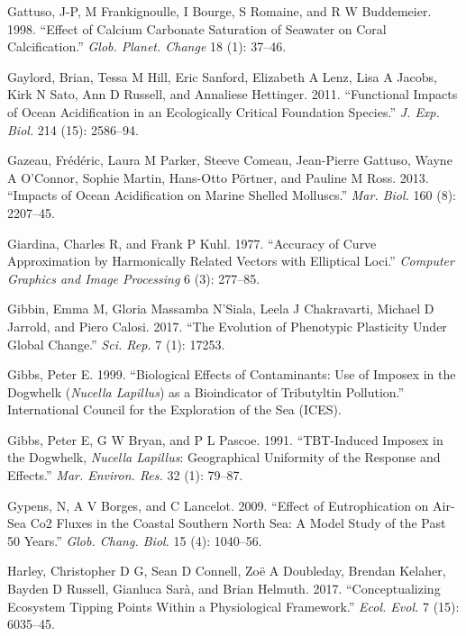 \documentclass[smallextended]{svjour3}       %
\newlength{\cslhangindent}
\newenvironment{CSLReferences}[2] %
 {%
  \setlength{\parindent}{0pt}
  \ifodd #1 \everypar{\setlength{\hangindent}{\cslhangindent}}\ignorespaces\fi
  \ifnum #2 > 0
  \setlength{\parskip}{#2\baselineskip}
  \fi
 }%
 {}
\begin{document}
\begin{CSLReferences}{1}{0}
\leavevmode{}%
Gattuso, J-P, M Frankignoulle, I Bourge, S Romaine, and R W Buddemeier.
1998. {``Effect of Calcium Carbonate Saturation of Seawater on Coral
Calcification.''} \emph{Glob. Planet. Change} 18 (1): 37--46.

\leavevmode{}%
Gaylord, Brian, Tessa M Hill, Eric Sanford, Elizabeth A Lenz, Lisa A
Jacobs, Kirk N Sato, Ann D Russell, and Annaliese Hettinger. 2011.
{``Functional Impacts of Ocean Acidification in an Ecologically Critical
Foundation Species.''} \emph{J. Exp. Biol.} 214 (15): 2586--94.

\leavevmode{}%
Gazeau, Frédéric, Laura M Parker, Steeve Comeau, Jean-Pierre Gattuso,
Wayne A O'Connor, Sophie Martin, Hans-Otto Pörtner, and Pauline M Ross.
2013. {``Impacts of Ocean Acidification on Marine Shelled Molluscs.''}
\emph{Mar. Biol.} 160 (8): 2207--45.

\leavevmode{}%
Giardina, Charles R, and Frank P Kuhl. 1977. {``Accuracy of Curve
Approximation by Harmonically Related Vectors with Elliptical Loci.''}
\emph{Computer Graphics and Image Processing} 6 (3): 277--85.

\leavevmode{}%
Gibbin, Emma M, Gloria Massamba N'Siala, Leela J Chakravarti, Michael D
Jarrold, and Piero Calosi. 2017. {``The Evolution of Phenotypic
Plasticity Under Global Change.''} \emph{Sci. Rep.} 7 (1): 17253.

\leavevmode{}%
Gibbs, Peter E. 1999. {``Biological Effects of Contaminants: Use of
Imposex in the Dogwhelk (\emph{Nucella Lapillus}) as a Bioindicator of
Tributyltin Pollution.''} International Council for the Exploration of
the Sea (ICES).

\leavevmode{}%
Gibbs, Peter E, G W Bryan, and P L Pascoe. 1991. {``TBT-Induced Imposex
in the Dogwhelk, \emph{Nucella Lapillus}: Geographical Uniformity of the
Response and Effects.''} \emph{Mar. Environ. Res.} 32 (1): 79--87.

\leavevmode{}%
Gypens, N, A V Borges, and C Lancelot. 2009. {``Effect of Eutrophication
on Air-Sea Co2 Fluxes in the Coastal Southern North Sea: A Model Study
of the Past 50 Years.''} \emph{Glob. Chang. Biol.} 15 (4): 1040--56.

\leavevmode{}%
Harley, Christopher D G, Sean D Connell, Zoë A Doubleday, Brendan
Kelaher, Bayden D Russell, Gianluca Sarà, and Brian Helmuth. 2017.
{``Conceptualizing Ecosystem Tipping Points Within a Physiological
Framework.''} \emph{Ecol. Evol.} 7 (15): 6035--45.


\end{CSLReferences}
\end{document}
